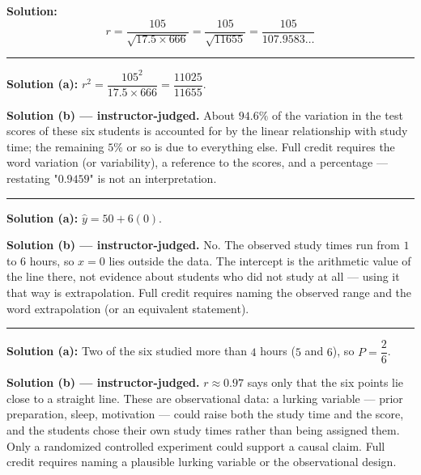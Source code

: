 \documentclass[12pt]{article}
\begin{document}

\textbf{Solution:} \quad
\[ r = \frac{105}{\sqrt{17.5 \times 666}} = \frac{105}{\sqrt{11655}} = \frac{105}{107.9583\ldots} \]

\vspace{0.15cm}\noindent\rule{\linewidth}{0.2pt}\vspace{0.15cm}


\textbf{Solution (a):} \quad $r^2 = \dfrac{105^2}{17.5 \times 666} = \dfrac{11025}{11655}$.

\textbf{Solution (b) --- instructor-judged.} \quad About $94.6\%$ of the variation in the test
scores of these six students is accounted for by the linear relationship with study time; the
remaining $5\%$ or so is due to everything else. Full credit requires the word variation (or
variability), a reference to the scores, and a percentage --- restating "$0.9459$" is not an
interpretation.

\vspace{0.15cm}\noindent\rule{\linewidth}{0.2pt}\vspace{0.15cm}


\textbf{Solution (a):} \quad $\hat{y} = 50 + 6(0)$. 

\textbf{Solution (b) --- instructor-judged.} \quad No. The observed study times run from $1$ to
$6$ hours, so $x = 0$ lies outside the data. The intercept is the arithmetic value of the line
there, not evidence about students who did not study at all --- using it that way is
extrapolation. Full credit requires naming the observed range and the word extrapolation (or
an equivalent statement).

\vspace{0.15cm}\noindent\rule{\linewidth}{0.2pt}\vspace{0.15cm}


\textbf{Solution (a):} \quad Two of the six studied more than $4$ hours ($5$ and $6$), so
$P = \dfrac{2}{6}$. 

\textbf{Solution (b) --- instructor-judged.} \quad $r \approx 0.97$ says only that the six
points lie close to a straight line. These are observational data: a lurking variable --- prior
preparation, sleep, motivation --- could raise both the study time and the score, and the
students chose their own study times rather than being assigned them. Only a randomized
controlled experiment could support a causal claim. Full credit requires naming a plausible
lurking variable or the observational design.
\end{document}
